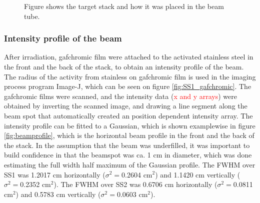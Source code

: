 \begin{figure}%
    \centering
    \caption{Figure shows the target stack and how it was placed in the beam tube.}%
    \label{fig:targetstack}%
\end{figure}


\subsubsection{Intensity profile of the beam}

After irradiation, gafchromic film were attached to the activated stainless steel in the front and the back of the stack, to obtain an intensity profile of the beam. The radius of the activity from stainless on gafchromic film is used in the imaging process program Image-J, which can be seen on figure \ref{fig:SS1_gafchromic}. The gafchromic films were scanned, and the intensity data (\textcolor{red}{x and y arrays}) were obtained by inverting the scanned image, and drawing a line segment along the beam spot that automatically created an position dependent intensity array. The intensity profile can be fitted to a Gaussian, which is shown examplewise in figure \ref{fig:beamprofile}, which is the horizontal beam profile in the front and the back of the stack. In the assumption that the beam was underfilled, it was important to build confidence in that the beamspot was ca. 1 cm in diameter, which was done estimating the full width half maximum of the Gaussian profile. The FWHM over SS1 was 1.2017 cm horizontally ($\sigma^2=$0.2604 cm$^2$) and 1.1420 cm vertically ($\sigma^2=$0.2352 cm$^2$). The FWHM over SS2 was 0.6706 cm horizontally ($\sigma^2=$0.0811 cm$^2$) and 0.5783 cm vertically ($\sigma^2=$0.0603 cm$^2$). \\

